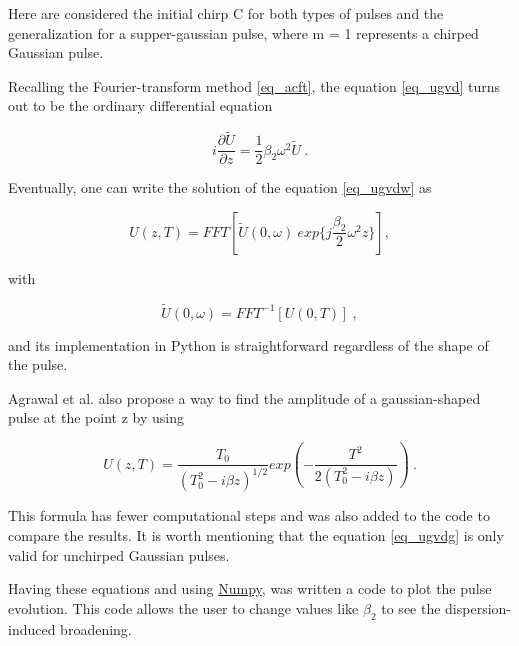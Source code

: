          Here are considered the initial chirp C for both types of pulses and the generalization for a supper-gaussian pulse, where m = 1 represents a chirped Gaussian pulse.
        
        
        Recalling the Fourier-transform method \eqref{eq_acft}, the equation \eqref{eq_ugvd} turns out to be the ordinary differential equation
        
        \begin{equation}\label{eq_ugvdw}
            i\frac{\partial\tilde{U}}{\partial z} = \frac{1}{2} \beta_2 \omega^2 \tilde{U} \ .
        \end{equation}
        
        Eventually, one can write the solution of the equation \eqref{eq_ugvdw} as
        
        \begin{equation}\label{eq_gvdufft}
            U(z,T) = FFT \left[ \tilde{U}(0,\omega) \ exp\{j\frac{\beta_2}{2}\omega^2z\} \right], 
        \end{equation}
        
        with
        
        \begin{equation}\label{eq_uw0gvd}
            \tilde{U}(0,\omega)  = FFT^{-1} \left[ U(0,T)\right] \ , 
        \end{equation}
        
        
        and its implementation in Python is straightforward regardless of the shape of the pulse.
        
        
        Agrawal et al. \citep{AgrawalBook} also propose a way to find the amplitude of a gaussian-shaped pulse at the point z by using 
        
        \begin{equation}\label{eq_ugvdg}
            U(z,T) = \frac{T_0}{(T^2_0 - i \beta z)^{1/2}} exp \left( -\frac{T^2}{2(T^2_0 - i \beta z)} \right) \ .
        \end{equation}
        
        This formula has fewer computational steps and was also added to the code to compare the results.  It is worth mentioning that the equation \eqref{eq_ugvdg} is only valid for unchirped  Gaussian pulses.
             
        Having these equations and using \href{https://numpy.org/}{Numpy}, was written a code to plot the pulse evolution. This code allows the user to change values like $\beta_2$ to see the dispersion-induced broadening. 
        
